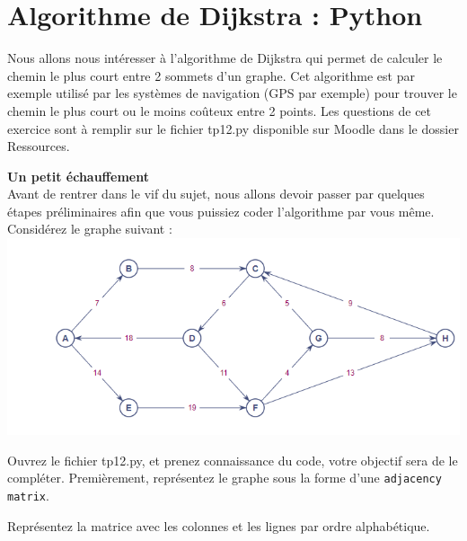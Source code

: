 \section{Algorithme de Dijkstra : Python}
Nous allons nous intéresser à l'algorithme de Dijkstra qui permet de calculer le chemin le plus court entre 2 sommets d'un graphe. Cet algorithme est par exemple utilisé par les systèmes de navigation (GPS par exemple) pour trouver le chemin le plus court ou le moins coûteux entre 2 points. Les questions de cet exercice sont à remplir sur le fichier tp12.py disponible sur Moodle dans le dossier Ressources. \\
\begin{Exercice}[10 minutes]\textbf{Un petit échauffement}\\

Avant de rentrer dans le vif du sujet, nous allons devoir passer par quelques étapes préliminaires afin que vous puissiez coder l'algorithme par vous même. Considérez le graphe suivant :\\
\includegraphics[scale=0.8]{resources/Dijkstra.PNG}

Ouvrez le fichier tp12.py, et prenez connaissance du code, votre objectif sera de le compléter. Premièrement, représentez le graphe sous la forme d'une \lstinline{adjacency matrix}.
\end{Exercice}
\begin{conseil}
    Représentez la matrice avec les colonnes et les lignes par ordre alphabétique.
\end{conseil}
\begin{solution}
    
\end{solution}
\newpage
